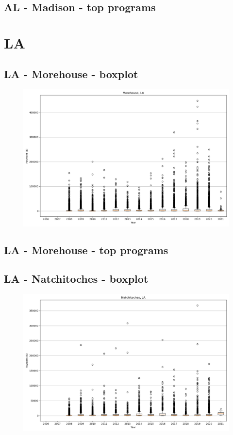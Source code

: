 \subsection*{AL - Madison - top programs}

\newpage
\section*{LA}
\subsection*{LA - Morehouse - boxplot}
\begin{figure}[h]
\centering
\includegraphics[width=7in]{../output/boxplots/counties/Morehouse-LA_boxplot.png}
\end{figure}


\subsection*{LA - Morehouse - top programs}

\newpage
\subsection*{LA - Natchitoches - boxplot}
\begin{figure}[h]
\centering
\includegraphics[width=7in]{../output/boxplots/counties/Natchitoches-LA_boxplot.png}
\end{figure}


